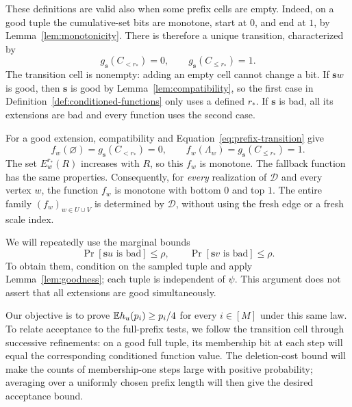 These definitions are valid also when some prefix cells are empty.
Indeed, on a good tuple the cumulative-set bits are monotone, start at
$0$, and end at $1$, by Lemma~\ref{lem:monotonicity}.  There is therefore
a unique transition, characterized by
\begin{equation}
  g_{\mathbf s}(C_{<r_*})=0,
  \qquad g_{\mathbf s}(C_{\le r_*})=1.
  \label{eq:prefix-transition}
\end{equation}
The transition cell is nonempty: adding an empty cell cannot change a
bit.  If $\mathbf s w$ is good, then $\mathbf s$ is good by
Lemma~\ref{lem:compatibility}, so the first case in
Definition~\ref{def:conditioned-functions} only uses a defined $r_*$.
If $\mathbf s$ is bad, all its extensions are bad and every function
uses the second case.

For a good extension, compatibility and
Equation~\eqref{eq:prefix-transition} give
\[
  f_w(\varnothing)=g_{\mathbf s}(C_{<r_*})=0,
  \qquad
  f_w(\Lambda_w)=g_{\mathbf s}(C_{\le r_*})=1.
\]
The set $E_w^{r_*}(R)$ increases with $R$, so this $f_w$ is monotone.
The fallback function has the same properties.  Consequently, for
\emph{every} realization of $\mathcal D$ and every vertex $w$, the
function $f_w$ is monotone with bottom $0$ and top $1$.  The entire
family $(f_w)_{w\in U\cup V}$ is determined by $\mathcal D$, without
using the fresh edge or a fresh scale index.

We will repeatedly use the marginal bounds
\begin{equation}
  \Pr[\mathbf s u\text{ is bad}]\le\rho,
  \qquad
  \Pr[\mathbf s v\text{ is bad}]\le\rho.
  \label{eq:sampled-extension-bad}
\end{equation}
To obtain them, condition on the sampled tuple and apply
Lemma~\ref{lem:goodness}; each tuple is independent of $\psi$.
This argument does not assert that all extensions are good
simultaneously.

Our objective is to prove $\mathbb E h_u(p_i)\ge p_i/4$ for every $i\in[M]$
under this same law.  To relate acceptance to the full-prefix tests,
we follow the transition cell through successive refinements: on a
good full tuple, its membership bit at each step will equal the
corresponding conditioned function value.  The deletion-cost bound
will make the counts of membership-one steps large with positive
probability; averaging over a uniformly chosen prefix length will
then give the desired acceptance bound.

